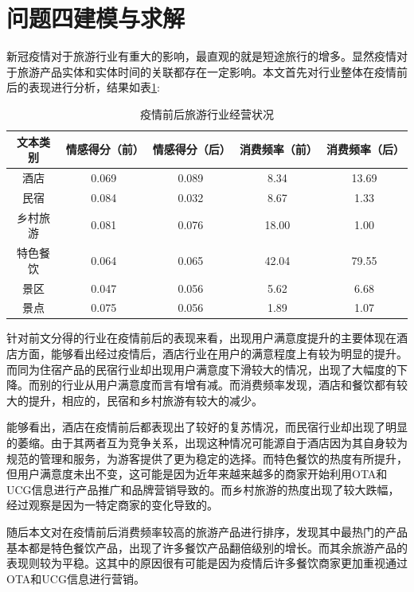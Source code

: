 \documentclass[bwprint]{gmcmthesis}
\begin{document}
\section{问题四建模与求解}

新冠疫情对于旅游行业有重大的影响，最直观的就是短途旅行的增多。显然疫情对于旅游产品实体和实体时间的关联都存在一定影响。本文首先对行业整体在疫情前后的表现进行分析，结果如表\ref{hangye_beforeafter}:

\begin{center}
    \begin{longtable}{c|c|c|c|c}
      \caption{疫情前后旅游行业经营状况}
      \label{hangye_beforeafter}\\
        \hline
        \textbf{文本类别} & \textbf{情感得分（前）} & \textbf{情感得分（后）} & \textbf{消费频率（前）} & \textbf{消费频率（后）} \\
        \hline
          酒店 & 0.069 & 0.089 &  8.34 & 13.69 \\
		  民宿 & 0.084 & 0.032 &  8.67 & 1.33 \\
		  乡村旅游 & 0.081 & 0.076 & 18.00 & 1.00 \\
		  特色餐饮 & 0.064 & 0.065 & 42.04 & 79.55 \\
		  景区 & 0.047 & 0.056 & 5.62 & 6.68 \\
		  景点 & 0.075 & 0.056 & 1.89 & 1.07 \\
        \hline
    \end{longtable}
    \end{center}

针对前文分得的行业在疫情前后的表现来看，出现用户满意度提升的主要体现在酒店方面，能够看出经过疫情后，酒店行业在用户的满意程度上有较为明显的提升。而同为住宿产品的民宿行业却出现用户满意度下滑较大的情况，出现了大幅度的下降。而别的行业从用户满意度而言有增有减。而消费频率发现，酒店和餐饮都有较大的提升，相应的，民宿和乡村旅游有较大的减少。

能够看出，酒店在疫情前后都表现出了较好的复苏情况，而民宿行业却出现了明显的萎缩。由于其两者互为竞争关系，出现这种情况可能源自于酒店因为其自身较为规范的管理和服务，为游客提供了更为稳定的选择。而特色餐饮的热度有所提升，但用户满意度未出不变，这可能是因为近年来越来越多的商家开始利用OTA和UCG信息进行产品推广和品牌营销导致的。而乡村旅游的热度出现了较大跌幅，经过观察是因为一特定商家的变化导致的。

随后本文对在疫情前后消费频率较高的旅游产品进行排序，发现其中最热门的产品基本都是特色餐饮产品，出现了许多餐饮产品翻倍级别的增长。而其余旅游产品的表现则较为平稳。这其中的原因很有可能是因为疫情后许多餐饮商家更加重视通过OTA和UCG信息进行营销。
\end{document}

